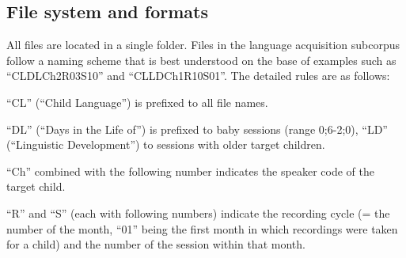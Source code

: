 \documentclass[a4paper, 11pt]{book}
\begin{document}

%
%

\subsection{File system and formats}

All files are located in a single folder. Files in the language acquisition subcorpus follow a naming scheme that is best understood on the base of examples such as “CLDLCh2R03S10” and “CLLDCh1\-R10S01”. The detailed rules are as follows: 

\begin{itemize*}
	\item “CL” (“Child Language”) is prefixed to all file names. 
	\item “DL” (“Days in the Life of”) is prefixed to baby sessions (range 0;6-2;0), “LD” (“Linguistic Development”) to sessions with older target children. 
	\item “Ch” combined with the following number indicates the speaker code of the target child.
	\item “R” and “S” (each with following numbers) indicate the recording cycle (= the number of the month, “01” being the first month in which recordings
		were taken for a child) and the number of the session within that month. 
\end{itemize*}
\end{document}
